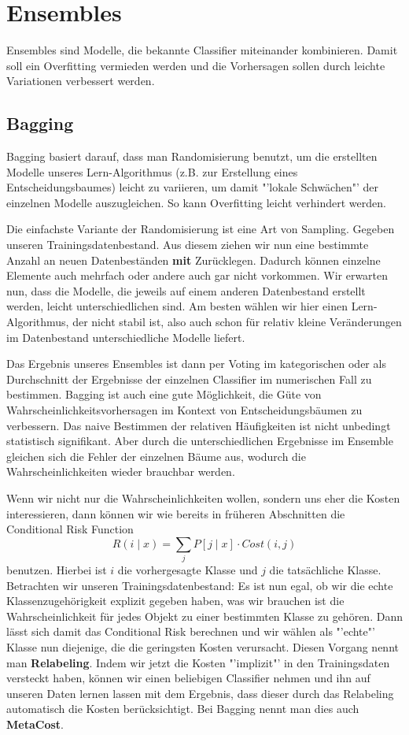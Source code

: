\section{Ensembles}
Ensembles sind Modelle, die bekannte Classifier miteinander
kombinieren. Damit soll ein Overfitting vermieden werden
und die Vorhersagen sollen durch leichte Variationen verbessert werden.

\subsection{Bagging}
Bagging basiert darauf, dass man Randomisierung benutzt,
um die erstellten Modelle unseres Lern-Algorithmus (z.B. 
zur Erstellung eines Entscheidungsbaumes) leicht zu variieren,
um damit "'lokale Schwächen"' der einzelnen Modelle auszugleichen.
So kann Overfitting leicht verhindert werden.

Die einfachste Variante der Randomisierung ist eine Art von Sampling.
Gegeben unseren Trainingsdatenbestand. Aus diesem ziehen wir nun eine
bestimmte Anzahl an neuen Datenbeständen \textbf{mit} Zurücklegen.
Dadurch können einzelne Elemente auch mehrfach oder andere auch gar
nicht vorkommen. Wir erwarten nun, dass die Modelle, die jeweils auf einem
anderen Datenbestand erstellt werden, leicht unterschiedlichen sind. Am besten
wählen wir hier einen Lern-Algorithmus, der nicht stabil ist, also auch schon für
relativ kleine Veränderungen im Datenbestand unterschiedliche Modelle liefert.

Das Ergebnis unseres Ensembles ist dann per Voting im kategorischen
oder als Durchschnitt der Ergebnisse der einzelnen Classifier
im numerischen Fall zu bestimmen. Bagging ist auch eine gute Möglichkeit,
die Güte von Wahrscheinlichkeitsvorhersagen im Kontext von Entscheidungsbäumen
zu verbessern. Das naive Bestimmen der relativen Häufigkeiten ist nicht
unbedingt statistisch signifikant. Aber durch die unterschiedlichen Ergebnisse
im Ensemble gleichen sich die Fehler der einzelnen Bäume aus, wodurch die
Wahrscheinlichkeiten wieder brauchbar werden.

Wenn wir nicht nur die Wahrscheinlichkeiten wollen, sondern uns eher
die Kosten interessieren, dann können wir wie bereits in früheren Abschnitten
die Conditional Risk Function
\[ R(i \mid x) = \sum_j P[j \mid x] \cdot Cost(i,j)\]
benutzen. Hierbei ist \(i\) die vorhergesagte Klasse und \(j\) die tatsächliche
Klasse. Betrachten wir unseren Trainingsdatenbestand: Es ist nun egal,
ob wir die echte Klassenzugehörigkeit explizit gegeben haben, was wir brauchen
ist die Wahrscheinlichkeit für jedes Objekt zu einer bestimmten Klasse zu gehören.
Dann lässt sich damit das Conditional Risk berechnen und wir wählen als "'echte"'
Klasse nun diejenige, die die geringsten Kosten verursacht. Diesen Vorgang nennt
man \textbf{Relabeling}. Indem wir jetzt die Kosten "'implizit"' in den 
Trainingsdaten versteckt haben, können wir einen beliebigen Classifier nehmen
und ihn auf unseren Daten lernen lassen mit dem Ergebnis, dass dieser durch das
Relabeling automatisch die Kosten berücksichtigt. Bei Bagging nennt man dies
auch \textbf{MetaCost}.

